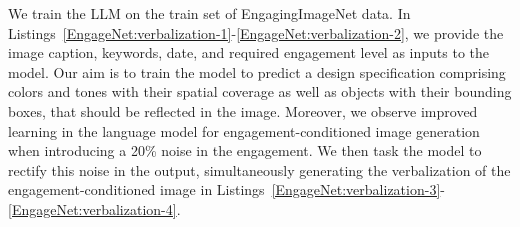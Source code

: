 We train the LLM on the train set of EngagingImageNet data. In Listings~\ref{EngageNet:verbalization-1}-\ref{EngageNet:verbalization-2}, we provide the image caption, keywords, date, and required engagement level as inputs to the model. Our aim is to train the model to predict a design specification comprising colors and tones with their spatial coverage as well as objects with their bounding boxes, that should be reflected in the image. Moreover, we observe improved learning in the language model for engagement-conditioned image generation when introducing a 20\% noise in the engagement. We then task the model to rectify this noise in the output, simultaneously generating the verbalization of the engagement-conditioned image in Listings~\ref{EngageNet:verbalization-3}-\ref{EngageNet:verbalization-4}.





 

